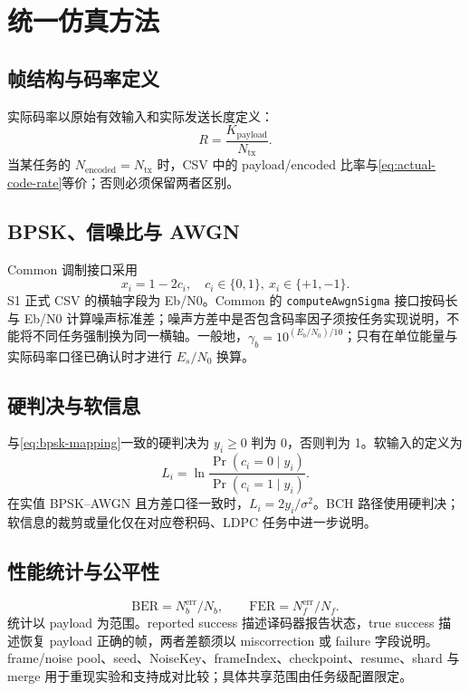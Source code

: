 \chapter{统一仿真方法}\label{chap:simulation}
\section{帧结构与码率定义}
实际码率以原始有效输入和实际发送长度定义：
\begin{equation}R=\frac{K_{\mathrm{payload}}}{N_{\mathrm{tx}}}.\label{eq:actual-code-rate}\end{equation}
当某任务的 $N_{\mathrm{encoded}}=N_{\mathrm{tx}}$ 时，CSV 中的 payload/encoded 比率与\cref{eq:actual-code-rate}等价；否则必须保留两者区别。
\section{BPSK、信噪比与 AWGN}
Common 调制接口采用
\begin{equation}x_i=1-2c_i,\quad c_i\in\{0,1\},\ x_i\in\{+1,-1\}.\label{eq:bpsk-mapping}\end{equation}
S1 正式 CSV 的横轴字段为 Eb/N0。Common 的 \texttt{computeAwgnSigma} 接口按码长与 Eb/N0 计算噪声标准差；噪声方差中是否包含码率因子须按任务实现说明，不能将不同任务强制换为同一横轴。一般地，$\gamma_b=10^{(E_b/N_0)/10}$；只有在单位能量与实际码率口径已确认时才进行 $E_s/N_0$ 换算。
\section{硬判决与软信息}
与\cref{eq:bpsk-mapping}一致的硬判决为 $y_i\geq0$ 判为 0，否则判为 1。软输入的定义为
\begin{equation}L_i=\ln\frac{\Pr(c_i=0\mid y_i)}{\Pr(c_i=1\mid y_i)}.\label{eq:llr-definition}\end{equation}
在实值 BPSK--AWGN 且方差口径一致时，$L_i=2y_i/\sigma^2$。BCH 路径使用硬判决；软信息的裁剪或量化仅在对应卷积码、LDPC 任务中进一步说明。
\section{性能统计与公平性}
\begin{equation}\mathrm{BER}=N_b^{\mathrm{err}}/N_b,\qquad \mathrm{FER}=N_f^{\mathrm{err}}/N_f.\label{eq:ber-fer}\end{equation}
统计以 payload 为范围。reported success 描述译码器报告状态，true success 描述恢复 payload 正确的帧，两者差额须以 miscorrection 或 failure 字段说明。frame/noise pool、seed、NoiseKey、frameIndex、checkpoint、resume、shard 与 merge 用于重现实验和支持成对比较；具体共享范围由任务级配置限定。
